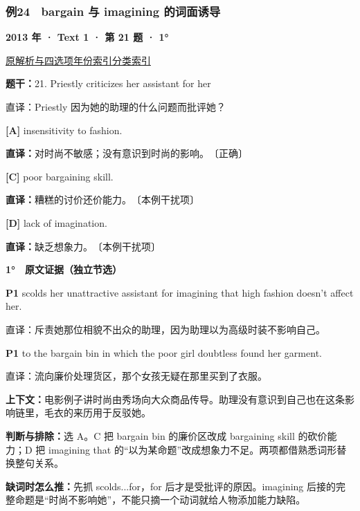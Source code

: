 \documentclass[11pt,a4paper]{article}
\begin{document}
\subsubsection{例24　bargain 与 imagining 的词面诱导}\label{case-2013-T1-Q21}
\noindent\textbf{2013 年 · Text 1 · 第 21 题 · 1°}\par\noindent \href{https://zj139.github.io/math-notes/english/e12e6c6712b9ddb12ecc7057/\#q21}{原解析与四选项}\quad \hyperref[idx-2013-T1-Q21]{年份索引}\quad \hyperref[class-R12]{分类索引}\par\smallskip
\noindent\textbf{题干：}21. Priestly criticizes her assistant for her\par
直译：Priestly 因为她的助理的什么问题而批评她？\par
{}\noindent\textbf{[A]} insensitivity to fashion.\par\nopagebreak
\noindent\textbf{直译：}对时尚不敏感；没有意识到时尚的影响。　〔正确〕\par
{}\noindent\textbf{[C]} poor bargaining skill.\par\nopagebreak
\noindent\textbf{直译：}糟糕的讨价还价能力。　〔本例干扰项〕\par
{}\noindent\textbf{[D]} lack of imagination.\par\nopagebreak
\noindent\textbf{直译：}缺乏想象力。　〔本例干扰项〕\par
\begin{evidence}\textbf{1°　原文证据（独立节选）}\par
\textbf{P1} scolds her unattractive assistant for imagining that high fashion doesn't affect her.\par 直译：斥责她那位相貌不出众的助理，因为助理以为高级时装不影响自己。\par
\textbf{P1} to the bargain bin in which the poor girl doubtless found her garment.\par 直译：流向廉价处理货区，那个女孩无疑在那里买到了衣服。\par
\end{evidence}
\noindent\textbf{上下文：}电影例子讲时尚由秀场向大众商品传导。助理没有意识到自己也在这条影响链里，毛衣的来历用于反驳她。\par
\noindent\textbf{判断与排除：}选 A。C 把 bargain bin 的廉价区改成 bargaining skill 的砍价能力；D 把 imagining that 的“以为某命题”改成想象力不足。两项都借熟悉词形替换整句关系。\par
\noindent\textbf{缺词时怎么推：}先抓 scolds...for，for 后才是受批评的原因。imagining 后接的完整命题是“时尚不影响她”，不能只摘一个动词就给人物添加能力缺陷。\par
\end{document}
